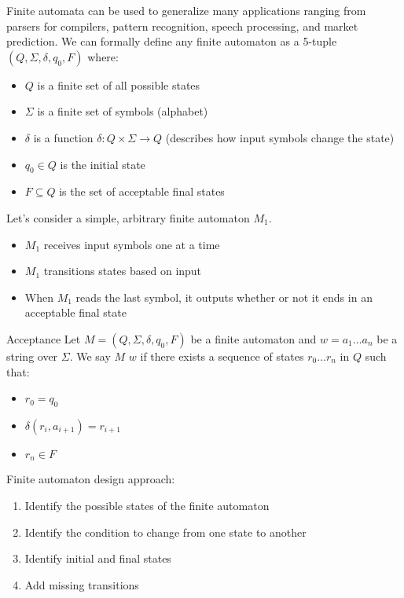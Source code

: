\documentclass[12pt]{report}
\begin{document}
Finite automata can be used to generalize many applications ranging from parsers for compilers, pattern recognition, speech processing, and market prediction. We can formally define any finite automaton as a 5-tuple $(Q, \Sigma, \delta, q_0, F)$ where:
\begin{itemize}
    \item $Q$ is a finite set of all possible states
    \item $\Sigma$ is a finite set of symbols (alphabet)
    \item $\delta$ is a function $\delta : Q \times \Sigma \to Q$ (describes how input symbols change the state)
    \item $q_0 \in Q$ is the initial state
    \item $F \subseteq Q$ is the set of acceptable final states
\end{itemize}

Let's consider a simple, arbitrary finite automaton $M_1$.
\begin{itemize}
    \item $M_1$ receives input symbols one at a time
    \item $M_1$ transitions states based on input
    \item When $M_1$ reads the last symbol, it outputs whether or not it ends in an acceptable final state
\end{itemize}

\begin{dfnbox}{Acceptance}{}
    Let $M = (Q, \Sigma, \delta, q_0, F)$ be a finite automaton and $w = a_1 \ldots a_n$ be a string over $\Sigma$. We say $M$  $w$ if there exists a sequence of states $r_0 \ldots r_n$ in $Q$ such that:
    \begin{itemize}
        \item $r_0 = q_0$
        \item $\delta(r_i, a_{i+1}) = r_{i+1}$
        \item $r_n \in F$
    \end{itemize}
\end{dfnbox}

Finite automaton design approach:
\begin{enumerate}
    \item Identify the possible states of the finite automaton
    \item Identify the condition to change from one state to another
    \item Identify initial and final states
    \item Add missing transitions
\end{enumerate}
\end{document}
